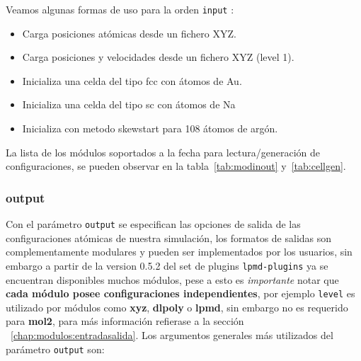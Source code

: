 Veamos algunas formas de uso para la orden \verb|input| :

\begin{itemize}
\item Carga posiciones at\'omicas desde un fichero XYZ.
\item Carga posiciones y velocidades desde un fichero XYZ (level 1).
\item Inicializa una celda del tipo fcc con átomos de Au.
\item Inicializa una celda del tipo sc con átomos de Na
\item Inicializa con metodo skewstart para 108 \'atomos de arg\'on.
\end{itemize}

La lista de los m\'odulos soportados a la fecha para lectura/generaci\'on de
configuraciones, se pueden observar en la tabla~\ref{tab:modinout}
y~\ref{tab:cellgen}.

\subsubsection{output}

Con el par\'ametro \verb|output| se especifican las opciones de salida de las
configuraciones at\'omicas de nuestra simulaci\'on, los formatos de salidas son
complementamente modulares y pueden ser implementados por los usuarios, sin
embargo a partir de la version 0.5.2 del set de plugins \verb|lpmd-plugins| ya
se encuentran disponibles muchos m\'odulos, pese a esto es \textit{importante}
notar que \textbf{cada m\'odulo posee configuraciones independientes}, por
ejemplo \verb|level| es utilizado por m\'odulos como \textbf{xyz},
\textbf{dlpoly} o \textbf{lpmd}, sin embargo no es requerido para \textbf{mol2},
para m\'as informaci\'on refierase a la secci\'on
~\ref{chap:modulos:entradasalida}. Los argumentos generales m\'as utilizados del
par\'ametro \verb|output| son:


